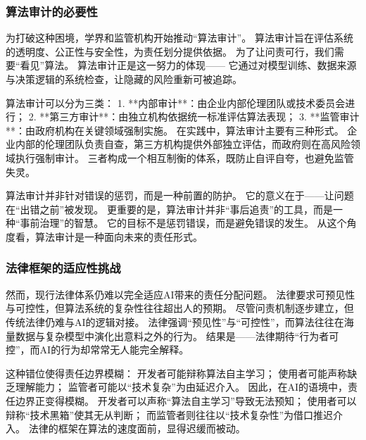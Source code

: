 \subsubsection{算法审计的必要性}

为打破这种困境，学界和监管机构开始推动“算法审计”。  
算法审计旨在评估系统的透明度、公正性与安全性，为责任划分提供依据。  
为了让问责可行，我们需要“看见”算法。  
算法审计正是这一努力的体现——  
它通过对模型训练、数据来源与决策逻辑的系统检查，让隐藏的风险重新可被追踪。

算法审计可以分为三类：  
1. **内部审计**：由企业内部伦理团队或技术委员会进行；  
2. **第三方审计**：由独立机构依据统一标准评估算法表现；  
3. **监管审计**：由政府机构在关键领域强制实施。  
在实践中，算法审计主要有三种形式。  
企业内部的伦理团队负责自查，第三方机构提供外部独立评估，而政府则在高风险领域执行强制审计。  
三者构成一个相互制衡的体系，既防止自评自夸，也避免监管失灵。

算法审计并非针对错误的惩罚，而是一种前置的防护。  
它的意义在于——让问题在“出错之前”被发现。  
更重要的是，算法审计并非“事后追责”的工具，而是一种“事前治理”的智慧。  
它的目标不是惩罚错误，而是避免错误的发生。  
从这个角度看，算法审计是一种面向未来的责任形式。

\subsubsection{法律框架的适应性挑战}

然而，现行法律体系仍难以完全适应AI带来的责任分配问题。  
法律要求可预见性与可控性，但算法系统的复杂性往往超出人的预期。  
尽管问责机制逐步建立，但传统法律仍难与AI的逻辑对接。  
法律强调“预见性”与“可控性”，而算法往往在海量数据与复杂模型中演化出意料之外的行为。  
结果是——法律期待“行为者可控”，而AI的行为却常常无人能完全解释。

这种错位使得责任边界模糊：  
开发者可能辩称算法自主学习；  
使用者可能声称缺乏理解能力；  
监管者可能以“技术复杂”为由延迟介入。  
因此，在AI的语境中，责任边界正变得模糊。  
开发者可以声称“算法自主学习”导致无法预知；  
使用者可以辩称“技术黑箱”使其无从判断；  
而监管者则往往以“技术复杂性”为借口推迟介入。  
法律的框架在算法的速度面前，显得迟缓而被动。

